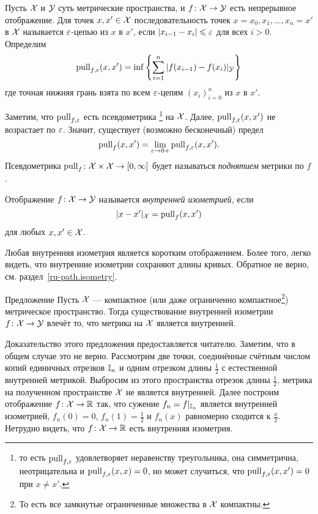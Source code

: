 \documentclass[oneside,a4paper]{article}
\begin{document}
Пусть $\mathcal{X}$ и $\mathcal{Y}$ суть метрические пространства, 
и $f\colon\mathcal{X}\to \mathcal{Y}$ есть 
непрерывное отображение.
Для точек $x,x'\in \mathcal{X}$ последовательность точек $x=x_0,x_1,\dots,x_n=x'$ в $\mathcal{X}$ называется $\varepsilon$-цепью из $x$ в $x'$, если $|x_{i-1}-x_i|\leqslant\varepsilon$ для всех $i>0$.
Определим
$$\mathop{\rm pull}\nolimits_{f,\varepsilon}(x,x')
=
\inf\left\{\sum_{i=1}^n|f(x_{i-1})-f(x_{i})|_{\mathcal{Y}}\right\}$$
где точная нижняя грань взята по всем $\varepsilon$-цепям $(x_i)_{i=0}^n$ из $x$ в $x'$.

Заметим, что $\mathop{\rm pull}\nolimits_{f,\varepsilon}$ есть псевдометрика%
\footnote{то есть $\mathop{\rm pull}\nolimits_{f,\varepsilon}$ удовлетворяет неравенству треугольника, она симметрична, неотрицательна и $\mathop{\rm pull}\nolimits_{f,\varepsilon}(x,x)=0$, но может случиться, что $\mathop{\rm pull}\nolimits_{f,\varepsilon}(x,x')=0$ при $x\not=x'$.}
на $\mathcal{X}$.
Далее, 
$\mathop{\rm pull}\nolimits_{f,\varepsilon}(x,x')$ не возрастает по $\varepsilon$.
Значит, существует (возможно бесконечный) предел
$$\mathop{\rm pull}\nolimits_{f}(x,x')=\lim_{\varepsilon\to0+}\mathop{\rm pull}\nolimits_{f,\varepsilon}(x,x').$$
Псевдометрика $\mathop{\rm pull}\nolimits_f\colon\mathcal{X}\times\mathcal{X}\to[0,\infty]$ будет называться \emph{поднятием} метрики по $f$.

Отображение $f\colon\mathcal{X}\to \mathcal{Y}$ называется \emph{внутренней изометрией}, если 
$$|x-x'|_{\mathcal{X}}=\mathop{\rm pull}\nolimits_f(x,x')$$
для любых $x,x'\in \mathcal{X}$.

Любая внутренняя изометрия является коротким отображением.
Более того, легко видеть, что внутренние изометрии сохраняют длины кривых.
Обратное не верно, см. раздел~\ref{ru-path.isometry}.

\begin{thm}{Предложение}\label{ru-int>int}
Пусть $\mathcal{X}$ --- компактное (или даже ограниченно компактное\footnote{То есть все замкнутые ограниченные множества в $\mathcal{X}$ компактны.}) метрическое пространство.
Тогда существование внутренней изометрии $f\colon\mathcal{X}\to \mathcal{Y}$ влечёт то, что метрика на $\mathcal{X}$ является внутренней.
\end{thm}

Доказательство этого предложения предоставляется читателю.
Заметим, что в общем случае это не верно.
Рассмотрим две точки, соединённые счётным числом копий единичных отрезков $\mathbb{I}_n$ и одним отрезком длины $\frac12$ с естественной внутренней метрикой.
Выбросим из этого пространства отрезок длины $\frac12$,
метрика на полученном пространстве $\mathcal{X}$ не является внутренней.
Далее построим отображение $f\colon\mathcal{X}\to\mathbb{R}$ так, что сужение $f_n=f|_{\mathbb{I}_n}$ является внутренней изометрией, $f_n(0)=0$, $f_n(1)=\tfrac12$ и $f_n(x)$ равномерно сходится к $\tfrac x2$.
Нетрудно видеть, что $f\colon\mathcal{X}\to\mathbb{R}$ есть внутренняя изометрия.
\end{document}
